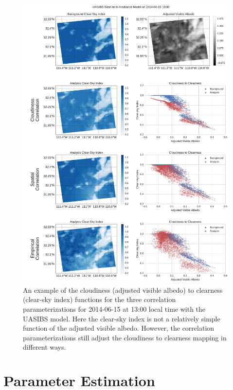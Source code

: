 \begin{figure}[p]
\centering
\includegraphics[width=\textwidth]{figs/cld_to_clear_UASIBS_2014-06-15.pdf}
\caption[Clearness versus Cloudiness for UASIBS on 6/15]{An example
  of the cloudiness (adjusted visible albedo) to clearness (clear-sky
  index) functions for the three correlation parameterizations for
  2014-06-15 at 13:00 local time with the UASIBS model. Here the
  clear-sky index is not a relatively simple function of the adjusted
  visible albedo. However, the correlation parameterizations still
  adjust the cloudiness to clearness mapping in different ways.}
\label{fig:cldclr_ua_615}
\end{figure}


\section{Parameter Estimation}
\label{sec:paramopt}

